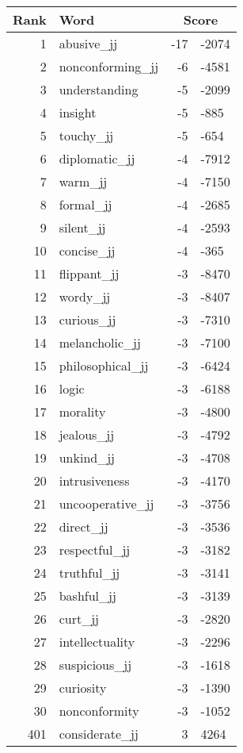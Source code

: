 \begin{longtable}[!htbp]{| rlr@{.}l |}
    \hline
    \textbf{Rank} & \textbf{Word} & \multicolumn{2}{c|}{\textbf{Score}} \\
    \hline
    \endhead
    1 & abusive\_jj & -17 & -2074 \\
    2 & nonconforming\_jj & -6 & -4581 \\
    3 & understanding & -5 & -2099 \\
    4 & insight & -5 & -885 \\
    5 & touchy\_jj & -5 & -654 \\
    6 & diplomatic\_jj & -4 & -7912 \\
    7 & warm\_jj & -4 & -7150 \\
    8 & formal\_jj & -4 & -2685 \\
    9 & silent\_jj & -4 & -2593 \\
    10 & concise\_jj & -4 & -365 \\
    11 & flippant\_jj & -3 & -8470 \\
    12 & wordy\_jj & -3 & -8407 \\
    13 & curious\_jj & -3 & -7310 \\
    14 & melancholic\_jj & -3 & -7100 \\
    15 & philosophical\_jj & -3 & -6424 \\
    16 & logic & -3 & -6188 \\
    17 & morality & -3 & -4800 \\
    18 & jealous\_jj & -3 & -4792 \\
    19 & unkind\_jj & -3 & -4708 \\
    20 & intrusiveness & -3 & -4170 \\
    21 & uncooperative\_jj & -3 & -3756 \\
    22 & direct\_jj & -3 & -3536 \\
    23 & respectful\_jj & -3 & -3182 \\
    24 & truthful\_jj & -3 & -3141 \\
    25 & bashful\_jj & -3 & -3139 \\
    26 & curt\_jj & -3 & -2820 \\
    27 & intellectuality & -3 & -2296 \\
    28 & suspicious\_jj & -3 & -1618 \\
    29 & curiosity & -3 & -1390 \\
    30 & nonconformity & -3 & -1052 \\
    401 & considerate\_jj & 3 & 4264 \\

\end{longtable}
